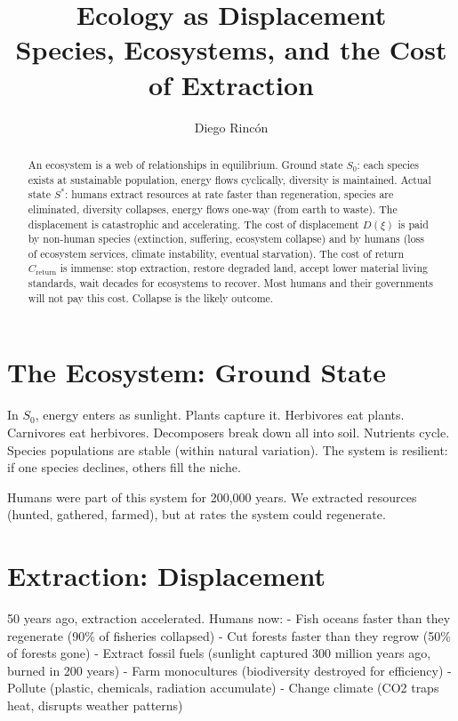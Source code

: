 \documentclass[12pt]{article}
\title{Ecology as Displacement\\
Species, Ecosystems, and the Cost of Extraction}
\author{Diego Rincón}
\date{}
\begin{document}
\maketitle

\begin{abstract}
An ecosystem is a web of relationships in equilibrium. Ground state $S_0$: each species exists at sustainable population, energy flows cyclically, diversity is maintained. Actual state $S^*$: humans extract resources at rate faster than regeneration, species are eliminated, diversity collapses, energy flows one-way (from earth to waste). The displacement is catastrophic and accelerating. The cost of displacement $D(\xi)$ is paid by non-human species (extinction, suffering, ecosystem collapse) and by humans (loss of ecosystem services, climate instability, eventual starvation). The cost of return $C_{\text{return}}$ is immense: stop extraction, restore degraded land, accept lower material living standards, wait decades for ecosystems to recover. Most humans and their governments will not pay this cost. Collapse is the likely outcome.
\end{abstract}

\section{The Ecosystem: Ground State}

In $S_0$, energy enters as sunlight. Plants capture it. Herbivores eat plants. Carnivores eat herbivores. Decomposers break down all into soil. Nutrients cycle. Species populations are stable (within natural variation). The system is resilient: if one species declines, others fill the niche.

Humans were part of this system for 200,000 years. We extracted resources (hunted, gathered, farmed), but at rates the system could regenerate.

\section{Extraction: Displacement}

50 years ago, extraction accelerated. Humans now:
- Fish oceans faster than they regenerate (90\% of fisheries collapsed)
- Cut forests faster than they regrow (50\% of forests gone)
- Extract fossil fuels (sunlight captured 300 million years ago, burned in 200 years)
- Farm monocultures (biodiversity destroyed for efficiency)
- Pollute (plastic, chemicals, radiation accumulate)
- Change climate (CO2 traps heat, disrupts weather patterns)
\end{document}
